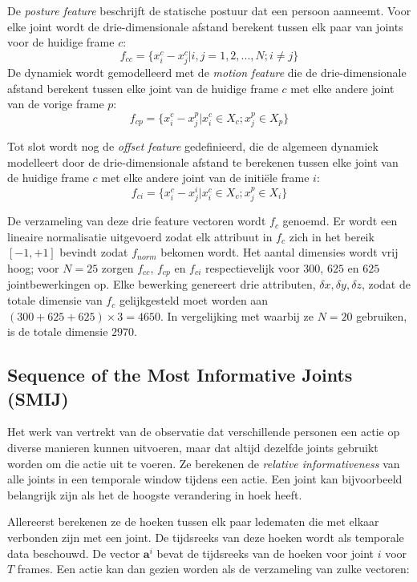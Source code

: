 De \textit{posture feature} beschrijft de statische postuur dat een persoon aanneemt. Voor elke joint wordt de drie-dimensionale afstand berekent tussen elk paar van joints voor de huidige frame $c$:
$$f_{cc} = \{x_i^c - x_j^c | i , j = 1, 2, ..., N; i \neq j\}$$
De dynamiek wordt gemodelleerd met de \textit{motion feature} die de drie-dimensionale afstand berekent tussen elke joint van de huidige frame $c$ met elke andere joint van de vorige frame $p$: 
$$f_{cp} = \{x_i^c - x_j^p | x_i^c \in X_c ; x_j^p \in X_p \}$$

Tot slot wordt nog de \textit{offset feature} gedefinieerd, die de algemeen dynamiek modelleert door de drie-dimensionale afstand te berekenen tussen elke joint van de huidige frame $c$ met elke andere joint van de initiële frame $i$:
$$f_{ci} = \{x_i^c - x_j^i |  x_i^c \in X_c ; x_j^p \in X_i \}$$

De verzameling van deze drie feature vectoren wordt $f_c$ genoemd. Er wordt een lineaire normalisatie uitgevoerd zodat elk attribuut in $f_c$ zich in het bereik $[-1, +1]$ bevindt zodat $f_{norm}$ bekomen wordt. Het aantal dimensies wordt vrij hoog; voor $N = 25$ zorgen $f_{cc}$, $f_{cp}$ en $f_{ci}$ respectievelijk voor $300$, $625$ en $625$ jointbewerkingen op. Elke bewerking genereert drie attributen, $\delta x, \delta y, \delta z$, zodat de totale dimensie van $f_c$ gelijkgesteld moet worden aan $ (300 + 625 + 625) \times 3 = 4650$. In vergelijking met \cite{Yang2012} waarbij ze $N = 20$ gebruiken, is de totale dimensie $2970$.

\subsection{Sequence of the Most Informative Joints (SMIJ)}
Het werk van \cite{Ofli2012} vertrekt van de observatie dat verschillende personen een actie op diverse manieren kunnen uitvoeren, maar dat altijd dezelfde joints gebruikt worden om die actie uit te voeren. Ze berekenen de \textit{relative informativeness} van alle joints in een temporale window tijdens een actie. Een joint kan bijvoorbeeld belangrijk zijn als het de hoogste verandering in hoek heeft. 

Allereerst berekenen ze de hoeken tussen elk paar ledematen die met elkaar verbonden zijn met een joint. De tijdsreeks van deze hoeken wordt als temporale data beschouwd. De vector $\textbf{a}^i$ bevat de tijdsreeks van de hoeken voor joint $i$ voor $T$ frames. Een actie kan dan gezien worden als de verzameling van zulke vectoren:

